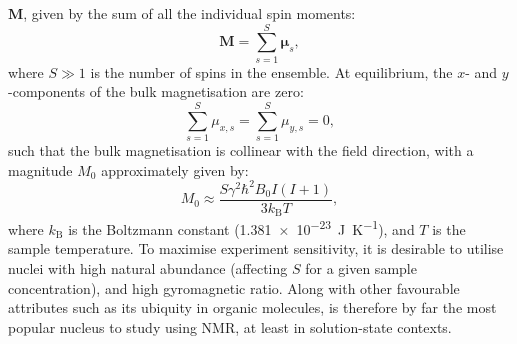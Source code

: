 $\symbf{M}$, given by the sum of all the individual spin moments:
\begin{equation}
    \symbf{M} = \sum\limits_{s=1}^{S} \symbf{\mu}_s,
\end{equation}
where $S \gg 1$ is the number of spins in the ensemble.
At equilibrium, the $x$- and $y$-components of the bulk magnetisation are zero:
\begin{equation}
    \sum_{s=1}^{S} \mu_{x,s} = \sum_{s=1}^{S} \mu_{y,s} = 0,
\end{equation}
such that the bulk magnetisation is collinear with the field direction, with a
magnitude $M_0$ approximately given by\cite[Section 1.1]{Cavanagh2007}:
\begin{equation}
    M_0 \approx \frac{S \gamma^2 \hbar^2 B_0 I (I + 1)}{3 k_{\text{B}} T},
\end{equation}
where $k_{\text{B}}$ is the Boltzmann constant
(\qty{1.381e-23}{\joule\per\kelvin}),
and $T$ is the sample temperature. To maximise experiment sensitivity, it is
desirable to
utilise nuclei with high natural abundance (affecting $S$ for a given sample
concentration), and high
gyromagnetic ratio. Along with other favourable attributes such as its ubiquity
in organic molecules,  is therefore by far the most popular nucleus to
study using \ac{NMR}, at least in solution-state contexts.


